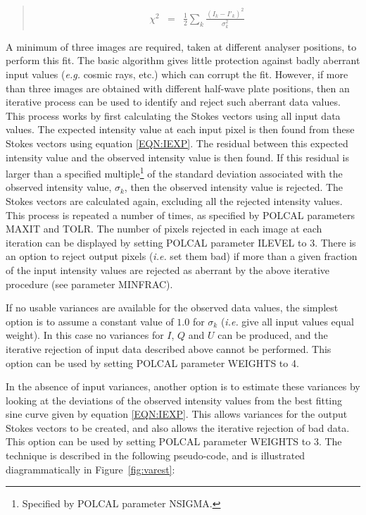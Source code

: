 \documentclass[twoside,11pt]{starlink}
\newenvironment{myquote}{\begin{quote}\begin{small}}{\end{small}\end{quote}}
\begin{document}
\begin{myquote}
\begin{eqnarray}
  \label{EQN:CHI}
  \chi^2 & = & \frac{1}{2}\sum_{k} \frac{(I_{k}-I'_{k})^2}{\sigma^2_{k}}
\end{eqnarray}
\end{myquote}

A minimum of three images are required, taken at different analyser
positions, to perform this fit. The basic algorithm gives little
protection against badly aberrant input values (\emph{e.g.} cosmic rays,
etc.) which can corrupt the fit. However, if more than three images are
obtained with different half-wave plate positions, then an iterative
process can be used to identify and reject such aberrant data values.
This process works by first calculating the Stokes vectors using all
input data values. The expected intensity value at each input pixel is
then found from these Stokes vectors using equation \ref{EQN:IEXP}. The
residual between this expected intensity value and the observed intensity
value is then found. If this residual is larger than a specified
multiple\footnote{Specified by POLCAL parameter NSIGMA.} of the standard
deviation associated with the observed intensity value, $\sigma_k$, then
the observed intensity value is rejected. The Stokes vectors are
calculated again, excluding all the rejected intensity values. This
process is repeated a number of times, as specified by POLCAL parameters
MAXIT and TOLR. The number of pixels rejected in each image at each iteration can
be displayed by setting POLCAL parameter ILEVEL to 3. There is an option
to reject output pixels (\emph{i.e.} set them bad) if more than a given
fraction of the input intensity values are rejected as aberrant by the
above iterative procedure (see parameter MINFRAC).

If no usable variances are available for the observed data values, the
simplest option is to assume a constant value of $1.0$ for $\sigma_{k}$
(\emph{i.e.} give all input values equal weight). In this case no
variances for $I$, $Q$ and $U$ can be produced, and the iterative rejection
of input data described above cannot be performed. This option can be
used by setting POLCAL parameter WEIGHTS to 4.

In the absence of input variances, another option is to estimate these
variances by looking at the deviations of the observed intensity values
from the best fitting sine curve given by equation \ref{EQN:IEXP}. This
allows variances for the output Stokes vectors to be created, and also
allows the iterative rejection of bad data. This option can be used by
setting POLCAL parameter WEIGHTS to 3. The technique is described in the
following pseudo-code, and is illustrated diagrammatically in
Figure~\ref{fig:varest}:
\end{document}
